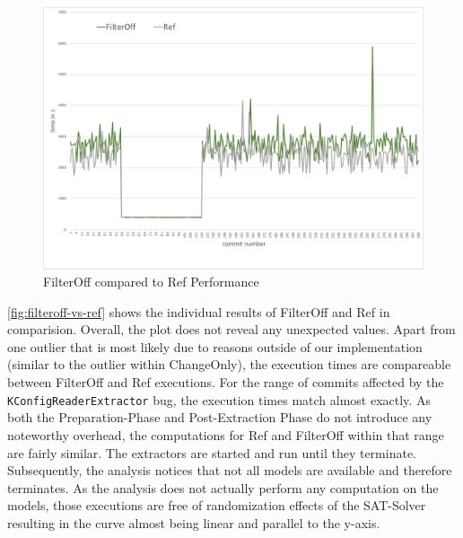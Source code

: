 \documentclass[a4paper]{article}
\begin{document}
\begin{figure}[h] 
  \centering
  \begin{minipage}[b]{1\textwidth} 
    \caption[FilterOff compared to Ref Performance]{FilterOff compared to Ref Performance}\label{fig:filteroff-vs-ref}
    \centering
    \includegraphics[height=1\textwidth, angle=90]{img/filteroff-vs-ref.pdf}
  \end{minipage}
\end{figure}


\autoref{fig:filteroff-vs-ref} shows the individual results of \textcolor{green!50!black}{FilterOff} and \textcolor{gray!80!black}{Ref} in comparision. Overall, the plot does not reveal any unexpected values. Apart from one outlier that is most likely due to reasons outside of our implementation (similar to the outlier within ChangeOnly), the execution times are compareable between FilterOff and Ref executions. For the range of commits affected by the \texttt{KConfigReaderExtractor} bug, the execution times match almost exactly. As both the Preparation-Phase and Post-Extraction Phase do not introduce any noteworthy overhead, the computations for Ref and FilterOff within that range are fairly similar. The extractors are started and run until they terminate. Subsequently, the analysis notices that not all models are available and therefore terminates. As the analysis does not actually perform any computation on the models, those executions are free of randomization effects of the SAT-Solver resulting in the curve almost being linear and parallel to the y-axis.
\end{document}
